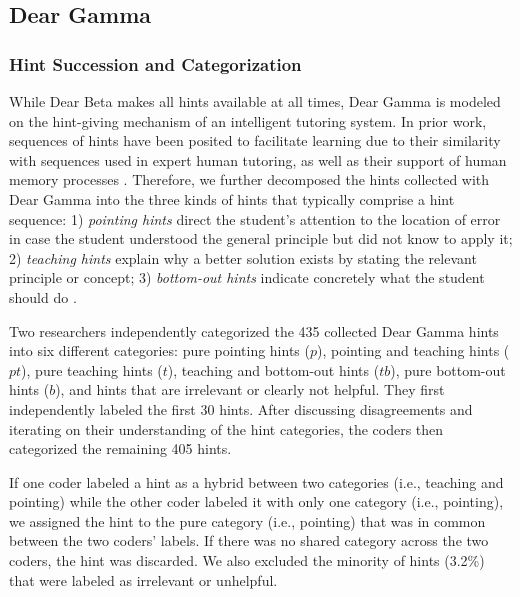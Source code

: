 \documentclass[12pt,twoside]{mitthesis}
\providecommand{\DIFaddbegin}{} %
\providecommand{\DIFaddend}{} %
\providecommand{\DIFdelbegin}{} %
\providecommand{\DIFdelend}{} %
\begin{document}
\DIFdelbegin %
\DIFdelend \DIFaddbegin \subsection{Dear Gamma}
\DIFaddend 

\subsubsection{Hint Succession and Categorization}
\DIFaddbegin 

\DIFaddend While Dear Beta makes all hints available at all times, Dear Gamma is modeled on the hint-giving mechanism of an intelligent tutoring system. In prior work, sequences of hints have been posited to facilitate learning due to their similarity with sequences used in expert human tutoring, as well as their support of human memory processes \cite{sottilare2014design}. Therefore, we further decomposed the hints collected with Dear Gamma into the three kinds of hints that typically comprise a hint sequence: 1) \textit{pointing hints} direct the student's attention to the location of error in case the student understood the general principle but did not know to apply it; 2) \textit{teaching hints} explain why a better solution exists by stating the relevant principle or concept; 3) \textit{bottom-out hints} indicate concretely what the student should do \cite{andes}. 

Two researchers independently categorized the 435 collected Dear Gamma hints into six different categories: pure pointing hints ($p$), pointing and teaching hints ($pt$), pure teaching hints ($t$), teaching and bottom-out hints ($tb$), pure bottom-out hints ($b$), and hints that are irrelevant or clearly not helpful. They first independently labeled the first 30 hints. After discussing disagreements and iterating on their understanding of the hint categories, the coders then categorized the remaining 405 hints. 

If one coder labeled a hint as a hybrid between two categories (i.e., teaching and pointing) while the other coder labeled it with only one category (i.e., pointing), we assigned the hint to the pure category (i.e., pointing) that was in common between the two coders' labels. If there was no shared category across the two coders, the hint was discarded. We also excluded the minority of hints (3.2\%) that were labeled as irrelevant or unhelpful.
\end{document}
